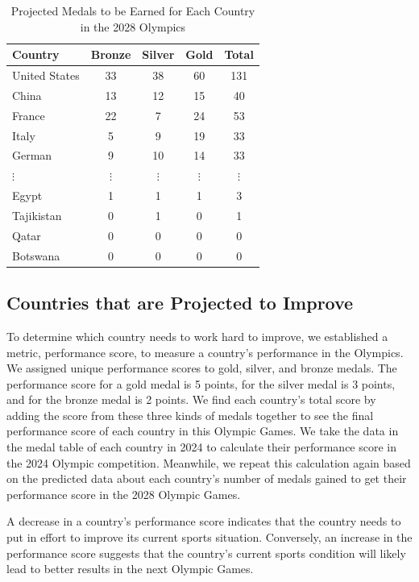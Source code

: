 \documentclass{mcmthesis}
\begin{document}
\begin{table}[H]
\centering 
\label{c}
\caption{Projected Medals to be Earned for Each Country in the 2028 Olympics}
\vspace{5pt}
\begin{tabular}{lcccc}
\hline
\textbf{Country} & \textbf{Bronze} & \textbf{Silver} & \textbf{Gold} & \textbf{Total}\\
\hline\hline
United States & 33 & 38 & 60 & 131 \\
China         & 13 & 12 & 15 & 40 \\
France        & 22 & 7 & 24 & 53 \\
Italy         & 5 & 9 & 19 & 33 \\
German        & 9 & 10 & 14 & 33 \\
$\vdots$ & $\vdots$ & $\vdots$ & $\vdots$ & $\vdots$ \\
Egypt         & 1 & 1 & 1 & 3 \\
Tajikistan    & 0 & 1 & 0 & 1 \\
Qatar         & 0 & 0 & 0 & 0 \\
Botswana      & 0 & 0 & 0 & 0 \\
\hline
\end{tabular}
\end{table}

\subsection{Countries that are Projected to Improve}
To determine which country needs to work hard to improve, we established a metric, performance score, to measure a country's performance in the Olympics. We assigned unique performance scores to gold, silver, and bronze medals. The performance score for a gold medal is 5 points, for the silver medal is 3 points, and for the bronze medal is 2 points. We find each country's total score by adding the score from these three kinds of medals together to see the final performance score of each country in this Olympic Games.
We take the data in the medal table of each country in 2024 to calculate their performance score in the 2024 Olympic competition. Meanwhile, we repeat this calculation again based on the predicted data about each country's number of medals gained to get their performance score in the 2028 Olympic Games. 

A decrease in a country's performance score indicates that the country needs to put in effort to improve its current sports situation. Conversely, an increase in the performance score suggests that the country's current sports condition will likely lead to better results in the next Olympic Games.
\end{document}
